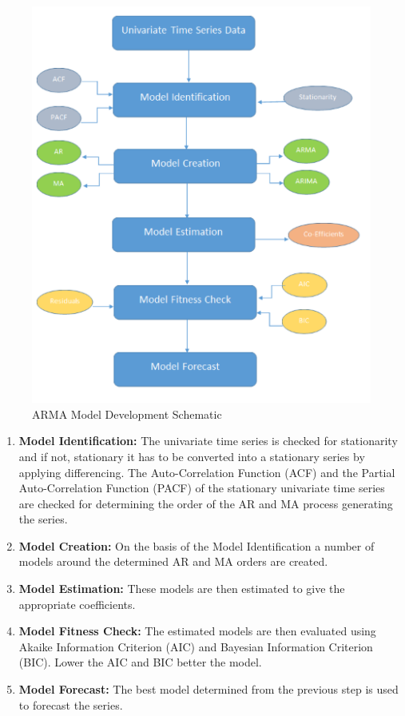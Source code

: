 \documentclass[journal]{IEEEtran}
\begin{document}
\begin{figure}[htpb]
\centering
\includegraphics[scale=0.75]{ARMASteps.png}
\caption{ARMA Model Development Schematic}
\label{fig4} %
\end{figure}

\begin{enumerate}

  \item \textbf{Model Identification:} The univariate time series is checked for stationarity and if not, stationary it has to be converted into a stationary series by applying differencing. The Auto-Correlation Function (ACF) and the Partial Auto-Correlation Function (PACF) of the stationary univariate time series are checked for determining the order of the AR and MA process generating the series.
  \item \textbf{Model Creation:} On the basis of the Model Identification a number of models around the determined AR and MA orders are created.
  \item \textbf{Model Estimation:} These models are then estimated to give the appropriate coefficients.
  \item \textbf{Model Fitness Check:} The estimated models are then evaluated using Akaike Information Criterion (AIC) and Bayesian Information Criterion (BIC). Lower the AIC and BIC better the model.
  \item \textbf{Model Forecast:} The best model determined from the previous step is used to forecast the series.


\end{enumerate}
\end{document}
